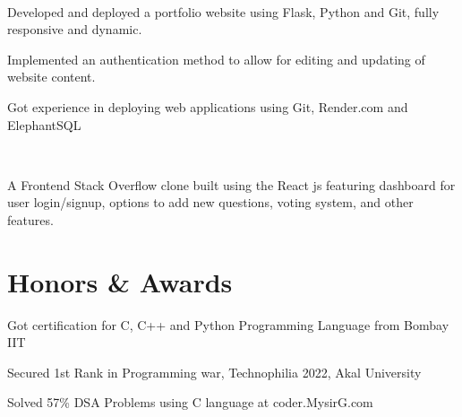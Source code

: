 \documentclass[]{deedy-resume-openfont}
\begin{document}
        
            \hfill {}\\
            \begin{tightemize}
\item Developed and deployed a portfolio website using Flask, Python and Git, fully responsive and dynamic.
\item Implemented an authentication method to allow for editing and updating of website content.
\item Got experience in deploying web applications using Git, Render.com and ElephantSQL
\end{tightemize}
            \sectionsep
          
        
            \hfill {}\\
            \begin{tightemize}
\item A Frontend Stack Overflow clone built using the React js featuring dashboard for user login/signup, options to add new questions, voting system, and other features.
\end{tightemize}
            \sectionsep

%
%
\section{Honors \& Awards}
\vspace{4pt}
\begin{tightemize}
\item Got certification for C, C++ and Python Programming Language from Bombay IIT\\
\item Secured 1st Rank in Programming war, Technophilia 2022, Akal University\\
\item Solved 57\% DSA Problems using C language at coder.MysirG.com\\
\end{tightemize}
      \ 
      
\end{document}
